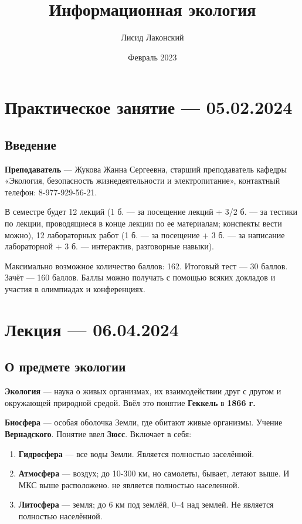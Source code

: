 \documentclass{article}
\title{Информационная экология}
\author{Лисид Лаконский}
\date{Февраль 2023}
\begin{document}
\raggedright

\maketitle

\tableofcontents
\pagebreak

\section{Практическое занятие — 05.02.2024}

\subsection{Введение}

\textbf{Преподаватель} — Жукова Жанна Сергеевна, старший преподаватель кафедры «Экология, безопасность жизнедеятельности и электропитание», контактный телефон: 8-977-929-56-21.

В семестре будет 12 лекций (1 б. — за посещение лекций + 3/2 б. — за тестики по лекции, проводящиеся в конце лекции по ее материалам; конспекты вести можно), 12 лабораторных работ (1 б. — за посещение + 3 б. — за написание лабораторной + 3 б. — интерактив, разговорные навыки).

Максимально возможное количество баллов: 162. Итоговый тест — 30 баллов. Зачёт — 160 баллов. Баллы можно получать с помощью всяких докладов и участия в олимпиадах и конференциях.

\section{Лекция — 06.04.2024}

\subsection{О предмете экологии}

\textbf{Экология} — наука о живых организмах, их взаимодействии друг с другом и окружающей природной средой. Ввёл это понятие \textbf{Геккель} в \textbf{1866 г.}

\textbf{Биосфера} — особая оболочка Земли, где обитают живые организмы. Учение \textbf{Вернадского}. Понятие ввел \textbf{Зюсс}. Включает в себя:

\begin{enumerate}
    \item \textbf{Гидросфера} — все воды Земли. Является полностью заселённой.
    \item \textbf{Атмосфера} — воздух; до 10-300 км, но самолеты, бывает, летают выше. И МКС выше расположено. не является полностью населенной.
    \item \textbf{Литосфера} — земля; до 6 км под землёй, 0–4 над землей. Не является полностью населённой.
\end{enumerate}
\end{document}

